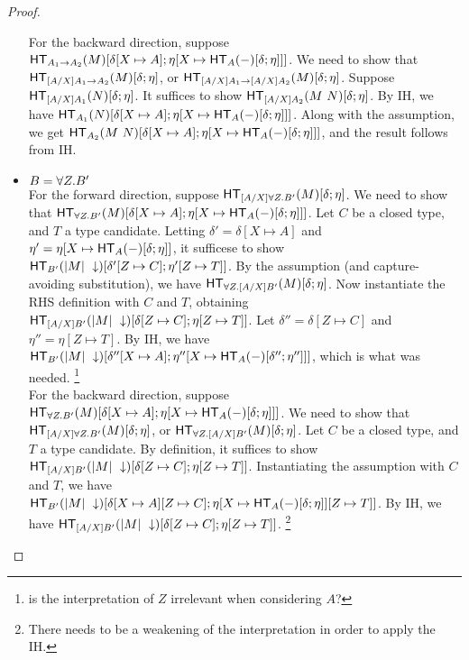 \documentclass{article}
\begin{document}
\begin{proof}
\begin{itemize}
For the backward direction, suppose 
$\mathsf{HT}_{A_1 \to A_2}(M)[\delta[X \mapsto A];\eta[X \mapsto \mathsf{HT}_{A}(-)[\delta;\eta]]]$. 
We need to show that $\mathsf{HT}_{[A/X]A_1 \to A_2}(M)[\delta;\eta]$, 
or $\mathsf{HT}_{[A/X]A_1 \to [A/X]A_2}(M)[\delta;\eta]$. Suppose $\mathsf{HT}_{[A/X]A_1}(N)[\delta;\eta]$. 
It suffices to show $\mathsf{HT}_{[A/X]A_2}(M\ N)[\delta;\eta]$. By IH, we have 
$\mathsf{HT}_{A_1}(N)[\delta[X \mapsto A];\eta[X \mapsto \mathsf{HT}_{A}(-)[\delta;\eta]]]$.
Along with the assumption, we get $\mathsf{HT}_{A_2}(M\ N)[\delta[X \mapsto A];\eta[X \mapsto \mathsf{HT}_{A}(-)[\delta;\eta]]]$, and the result follows from IH.

\item $B = \forall Z. B'$\\
For the forward direction, suppose $\mathsf{HT}_{[A/X]\forall Z. B'}(M)[\delta;\eta]$. We need to show that  
$\mathsf{HT}_{\forall Z. B'}(M)[\delta[X \mapsto A];\eta[X \mapsto \mathsf{HT}_{A}(-)[\delta;\eta]]]$. Let $C$ be a closed type, 
and $T$ a type candidate. Letting $\delta' = \delta[X \mapsto A]$ and 
$\eta' = \eta[X \mapsto \mathsf{HT}_{A}(-)[\delta;\eta]]$, it sufficese to show
$\mathsf{HT}_{B'}(|M|\ \downarrow)[\delta'[Z \mapsto C];\eta'[Z \mapsto T]]$. By the assumption (and 
capture-avoiding substitution), we have $\mathsf{HT}_{\forall Z. [A/X]B'}(M)[\delta;\eta]$. 
Now instantiate the RHS definition with $C$ and $T$, obtaining 
$\mathsf{HT}_{[A/X]B'}(|M|\ \downarrow)[\delta[Z \mapsto C];\eta[Z \mapsto T]]$. 
Let $\delta'' = \delta[Z \mapsto C]$ and $\eta'' = \eta[Z \mapsto T]$. By IH, we have 
$\mathsf{HT}_{B'}(|M|\ \downarrow)[\delta''[X \mapsto A];\eta''[X \mapsto \mathsf{HT}_{A}(-)[\delta'';\eta'']]]$, 
which is what was needed. \footnote{ is the interpretation of $Z$ irrelevant when considering $A$?}\\

For the backward direction, suppose 
$\mathsf{HT}_{\forall Z. B'}(M)[\delta[X \mapsto A];\eta[X \mapsto \mathsf{HT}_{A}(-)[\delta;\eta]]]$.
We need to show that $\mathsf{HT}_{[A/X]\forall Z. B'}(M)[\delta;\eta]$, or $\mathsf{HT}_{\forall Z. [A/X]B'}(M)[\delta;\eta]$. 
Let $C$ be a closed type, and $T$ a type candidate. By definition, it suffices
to show $\mathsf{HT}_{[A/X]B'}(|M|\ \downarrow)[\delta[Z \mapsto C];\eta[Z \mapsto T]]$. 
Instantiating the assumption with $C$ and $T$, we have $\mathsf{HT}_{B'}(|M|\ \downarrow)[\delta[X \mapsto A][Z \mapsto C];\eta[X \mapsto \mathsf{HT}_{A}(-)[\delta;\eta]][Z \mapsto T]]$. 
By IH, we have $\mathsf{HT}_{[A/X]B'}(|M|\ \downarrow)[\delta[Z \mapsto C];\eta[Z \mapsto T]]$. \footnote{There needs to be a weakening of the interpretation in order to apply the IH.}
\end{itemize}
\end{proof}
\end{document}
